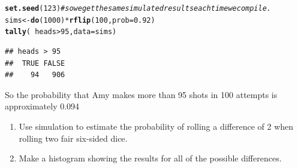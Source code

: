 \documentclass[twoside]{book}\usepackage[]{graphicx}\usepackage[]{xcolor}
\makeatletter
\newcommand{\hlnum}[1]{\textcolor[rgb]{0.686,0.059,0.569}{#1}}%
\newcommand{\hlcom}[1]{\textcolor[rgb]{0.678,0.584,0.686}{\textit{#1}}}%
\newcommand{\hlopt}[1]{\textcolor[rgb]{0,0,0}{#1}}%
\newcommand{\hlstd}[1]{\textcolor[rgb]{0.345,0.345,0.345}{#1}}%
\newcommand{\hlkwb}[1]{\textcolor[rgb]{0.69,0.353,0.396}{#1}}%
\newcommand{\hlkwc}[1]{\textcolor[rgb]{0.333,0.667,0.333}{#1}}%
\newcommand{\hlkwd}[1]{\textcolor[rgb]{0.737,0.353,0.396}{\textbf{#1}}}%
\newenvironment{kframe}{%
 \def\at@end@of@kframe{}%
 \ifinner\ifhmode%
  \def\at@end@of@kframe{\end{minipage}}%
  \begin{minipage}{\columnwidth}%
 \fi\fi%
 \def\FrameCommand##1{\hskip\@totalleftmargin \hskip-\fboxsep
 \colorbox{shadecolor}{##1}\hskip-\fboxsep
     \hskip-\linewidth \hskip-\@totalleftmargin \hskip\columnwidth}%
 \MakeFramed {\advance\hsize-\width
   \@totalleftmargin\z@ \linewidth\hsize
   \@setminipage}}%
 {\par\unskip\endMakeFramed%
 \at@end@of@kframe}
\newenvironment{knitrout}{}{} %
\makeatother
\begin{document}
\begin{solution}
\begin{knitrout}
\color{fgcolor}\begin{kframe}
\begin{alltt}
\hlkwd{set.seed}\hlstd{(}\hlnum{123}\hlstd{)}    \hlcom{# so we get the same simulated results each time we compile.}
\hlstd{sims} \hlkwb{<-} \hlkwd{do}\hlstd{(}\hlnum{1000}\hlstd{)} \hlopt{*} \hlkwd{rflip}\hlstd{(}\hlnum{100}\hlstd{,} \hlkwc{prob} \hlstd{=} \hlnum{0.92}\hlstd{)}
\hlkwd{tally}\hlstd{(} \hlopt{~} \hlstd{heads} \hlopt{>} \hlnum{95}\hlstd{,} \hlkwc{data} \hlstd{= sims)}
\end{alltt}
\begin{verbatim}
## heads > 95
##  TRUE FALSE 
##    94   906
\end{verbatim}
\end{kframe}
\end{knitrout}
So the probability that Amy makes more than 95 shots in 100 attempts is approximately
0.094
\end{solution}

\begin{problem}
	\begin{enumerate}
		\item
	Use simulation to estimate the probability of rolling a difference of 2 when rolling
	two fair six-sided dice.
\item
	Make a histogram showing the results for all of the possible differences.
	\end{enumerate}

\end{problem}
\end{document}
